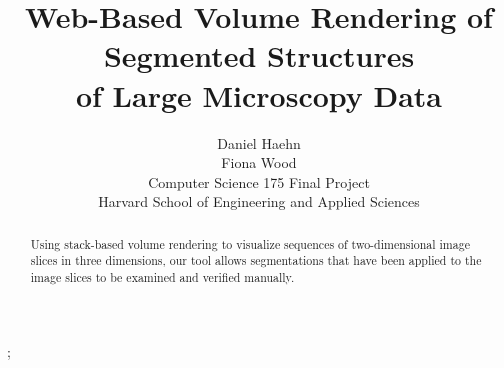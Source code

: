 \documentclass[annual]{acmsiggraph}
\title{Web-Based Volume Rendering of Segmented Structures \\ of Large Microscopy Data}
\author{Daniel Haehn\\Fiona Wood\\Computer Science 175 Final Project \\Harvard School of Engineering and Applied Sciences }
\begin{document}



\maketitle


\begin{abstract}

Using stack-based volume rendering to visualize sequences of two-dimensional image slices in three dimensions, our tool allows segmentations that have been applied to the image slices to be examined and verified manually.
\end{abstract}


\begin{CRcatlist}
  ;
\end{CRcatlist}


\keywordlist

\end{document}
